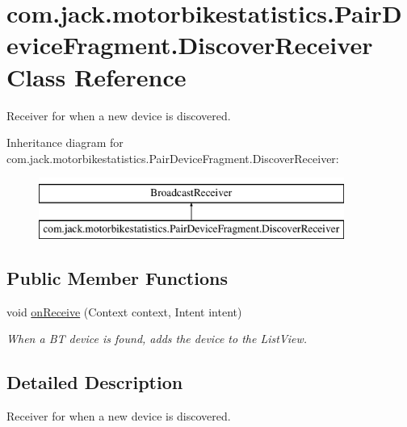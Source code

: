 \hypertarget{classcom_1_1jack_1_1motorbikestatistics_1_1_pair_device_fragment_1_1_discover_receiver}{}\section{com.\+jack.\+motorbikestatistics.\+Pair\+Device\+Fragment.\+Discover\+Receiver Class Reference}
\label{classcom_1_1jack_1_1motorbikestatistics_1_1_pair_device_fragment_1_1_discover_receiver}


Receiver for when a new device is discovered.  


Inheritance diagram for com.\+jack.\+motorbikestatistics.\+Pair\+Device\+Fragment.\+Discover\+Receiver\+:\begin{figure}[H]
\begin{center}
\leavevmode
\includegraphics[height=2.000000cm]{classcom_1_1jack_1_1motorbikestatistics_1_1_pair_device_fragment_1_1_discover_receiver}
\end{center}
\end{figure}
\subsection*{Public Member Functions}
\begin{DoxyCompactItemize}
\item 
void \hyperlink{classcom_1_1jack_1_1motorbikestatistics_1_1_pair_device_fragment_1_1_discover_receiver_a2581f3c35ac5161b0ee10dfa4a94d05b}{on\+Receive} (Context context, Intent intent)
\begin{DoxyCompactList}\small\item\em When a BT device is found, adds the device to the List\+View. \end{DoxyCompactList}\end{DoxyCompactItemize}


\subsection{Detailed Description}
Receiver for when a new device is discovered. 

